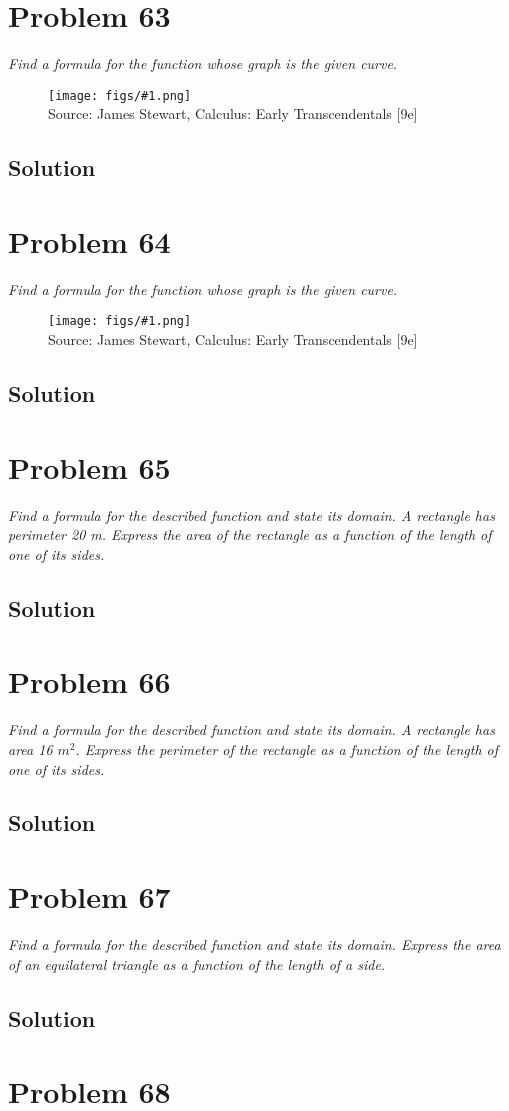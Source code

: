 \documentclass[11pt]{article}
\newcommand{\soln}{\subsection*}
\newcommand{\qn}{\textit}
\newcommand{\imagesource}[1]{{\footnotesize Source: #1}}
\newcommand{\imgqn}[1]{
	\begin{figure}[h]
		\centering
		\texttt{[image: figs/\#1.png]}\\
		\imagesource{James Stewart, Calculus: Early Transcendentals [9e]}
	\end{figure}
}
\begin{document}
\section*{Problem 63}

\qn{Find a formula for the function whose graph is the given curve.}

\imgqn{1.1.63}

\soln{Solution}

\section*{Problem 64}

\qn{Find a formula for the function whose graph is the given curve.}

\imgqn{1.1.64}

\soln{Solution}

\section*{Problem 65}

\qn{Find a formula for the described function and state its domain. A rectangle has perimeter 20 m. Express the area of the rectangle as a function of the length of one of its sides.}

\soln{Solution}

\section*{Problem 66}

\qn{Find a formula for the described function and state its domain. A rectangle has area 16 $m^2$. Express the perimeter of the rectangle as a function of the length of one of its sides.}

\soln{Solution}

\section*{Problem 67}

\qn{Find a formula for the described function and state its domain. Express the area of an equilateral triangle as a function of the length of a side.}

\soln{Solution}

\section*{Problem 68}
\end{document}
